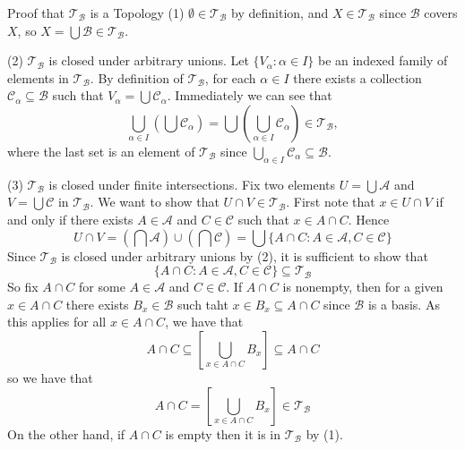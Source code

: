 \documentclass[12pt, a4paper, twoside, openright, titlepage]{book}
\begin{document}
\begin{proof*}{Proof that $\mathcal{T}_{\mathcal{B}}$ is a Topology}{}
    (1) $\emptyset \in \mathcal{T}_{\mathcal{B}}$ by definition, and $X \in \mathcal{T}_{\mathcal{B}}$ since $\mathcal{B}$ covers $X$, so $X = \bigcup\mathcal{B} \in \mathcal{T}_{\mathcal{B}}$.

    
    (2) $\mathcal{T}_{\mathcal{B}}$ is closed under arbitrary unions. Let $\{V_{\alpha}:\alpha \in I\}$ be an indexed family of elements in $\mathcal{T}_{\mathcal{B}}$. By definition of $\mathcal{T}_{\mathcal{B}}$, for each $\alpha \in I$ there exists a collection $\mathcal{C}_{\alpha} \subseteq \mathcal{B}$ such that $V_{\alpha} = \bigcup\mathcal{C}_{\alpha}$. Immediately we can see that \begin{equation*}
        \bigcup\limits_{\alpha\in I}\left(\bigcup\mathcal{C}_{\alpha}\right) = \bigcup\left(\bigcup\limits_{\alpha \in I}\mathcal{C}_{\alpha}\right) \in \mathcal{T}_{\mathcal{B}},
    \end{equation*}
    where the last set is an element of $\mathcal{T}_{\mathcal{B}}$ since $\bigcup_{\alpha \in I}\mathcal{C}_{\alpha} \subseteq \mathcal{B}$. 


    (3) $\mathcal{T}_{\mathcal{B}}$ is closed under finite intersections. Fix two elements $U = \bigcup\mathcal{A}$ and $V = \bigcup\mathcal{C}$ in $\mathcal{T}_{\mathcal{B}}$. We want to show that $U\cap V \in \mathcal{T}_{\mathcal{B}}$. First note that $x \in U\cap V$ if and only if there exists $A \in \mathcal{A}$ and $C \in \mathcal{C}$ such that $x \in A\cap C$. Hence \begin{equation*}
        U\cap V = \left(\bigcap\mathcal{A}\right)\cup\left(\bigcap\mathcal{C}\right) = \bigcup\{A\cap C:A\in\mathcal{A},C\in\mathcal{C}\}
    \end{equation*}
    Since $\mathcal{T}_{\mathcal{B}}$ is closed under arbitrary unions by (2), it is sufficient to show that \begin{equation*}
        \{A\cap C:A \in \mathcal{A},C\in\mathcal{C}\}\subseteq \mathcal{T}_{\mathcal{B}}
    \end{equation*}
    So fix $A\cap C$ for some $A \in \mathcal{A}$ and $C \in \mathcal{C}$. If $A\cap C$ is nonempty, then for a given $x \in A\cap C$ there exists $B_x \in \mathcal{B}$ such taht $x \in B_x \subseteq A\cap C$ since $\mathcal{B}$ is a basis. As this applies for all $x \in A\cap C$, we have that \begin{equation*}
        A\cap C\subseteq \left[\bigcup\limits_{x\in A\cap C}B_x\right]\subseteq A\cap C
    \end{equation*}
    so we have that \begin{equation*}
        A\cap C = \left[\bigcup\limits_{x\in A\cap C}B_x\right] \in \mathcal{T}_{\mathcal{B}}
    \end{equation*}
    On the other hand, if $A\cap C$ is empty then it is in $\mathcal{T}_{\mathcal{B}}$ by (1).
\end{proof*}
\end{document}
